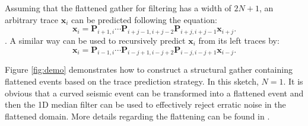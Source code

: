 %
 Assuming that the flattened gather for filtering has a width of $2N+1$,  an arbitrary trace $\mathbf{x}_i$ can be predicted following the equation:
\begin{equation}
\label{eq:recur}
\mathbf{x}_i=\mathbf{P}_{i+1,i}\cdots\mathbf{P}_{i+j-1,i+j-2}\mathbf{P}_{i+j,i+j-1}\mathbf{x}_{i+j}. 
\end{equation}
. A similar way can be used to recursively predict $\mathbf{x}_i$ from its left traces by:
\begin{equation}
\label{eq:recur}
\mathbf{x}_i=\mathbf{P}_{i-1,i}\cdots\mathbf{P}_{i-j+1,i-j+2}\mathbf{P}_{i-j,i-j+1}\mathbf{x}_{i-j}. 
\end{equation}

Figure \ref{fig:demo} demonstrates how to construct a structural gather containing flattened events based on the trace prediction strategy. In this sketch, $N=1$. It is obvious that a curved seismic event can be transformed into a flattened event and then the 1D median filter can be used to effectively reject erratic noise in the flattened domain. More details regarding the flattening can be found in \cite{liuyang2010}.

